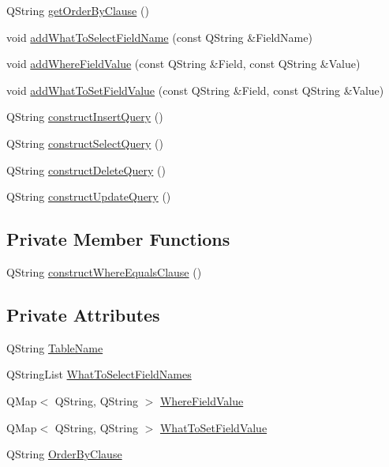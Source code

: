 \begin{DoxyCompactItemize}
\item 
Q\+String \hyperlink{class_query_constructor_a1041679e9ba316cd61ddca2d0d73360d}{get\+Order\+By\+Clause} ()
\item 
void \hyperlink{class_query_constructor_ab184e96ccdb30c0d6bedd904b6614e12}{add\+What\+To\+Select\+Field\+Name} (const Q\+String \&Field\+Name)
\item 
void \hyperlink{class_query_constructor_ad72f9e11656f92958cd6751eaaa70e0e}{add\+Where\+Field\+Value} (const Q\+String \&Field, const Q\+String \&Value)
\item 
void \hyperlink{class_query_constructor_a651b75170a7a1c7ddeae3758889133b0}{add\+What\+To\+Set\+Field\+Value} (const Q\+String \&Field, const Q\+String \&Value)
\item 
Q\+String \hyperlink{class_query_constructor_a707ac10b6fd4dfa235e2310b0259ea8e}{construct\+Insert\+Query} ()
\item 
Q\+String \hyperlink{class_query_constructor_ae832ca3bc59df18cb8ef08fc1d9fd75f}{construct\+Select\+Query} ()
\item 
Q\+String \hyperlink{class_query_constructor_a1585447293c477d7c5bebf4049cbbc07}{construct\+Delete\+Query} ()
\item 
Q\+String \hyperlink{class_query_constructor_ab17ea91cdd25440b863775526018da22}{construct\+Update\+Query} ()
\end{DoxyCompactItemize}
\subsection*{Private Member Functions}
\begin{DoxyCompactItemize}
\item 
Q\+String \hyperlink{class_query_constructor_a7c864e227c2e76cc40a887314d43a0fe}{construct\+Where\+Equals\+Clause} ()
\end{DoxyCompactItemize}
\subsection*{Private Attributes}
\begin{DoxyCompactItemize}
\item 
Q\+String \hyperlink{class_query_constructor_a228bdb4e6c32a592d96fe0a2562d7220}{Table\+Name}
\item 
Q\+String\+List \hyperlink{class_query_constructor_a70251e50580cef59cbbee0c4626cf32f}{What\+To\+Select\+Field\+Names}
\item 
Q\+Map$<$ Q\+String, Q\+String $>$ \hyperlink{class_query_constructor_ad20cc356b8452f51ddb326e989b3db9d}{Where\+Field\+Value}
\item 
Q\+Map$<$ Q\+String, Q\+String $>$ \hyperlink{class_query_constructor_a13e503b74e3422d2b816e5e41e646f04}{What\+To\+Set\+Field\+Value}
\item 
Q\+String \hyperlink{class_query_constructor_ad17e64b29d7e1f8fb61756eff17dd099}{Order\+By\+Clause}
\end{DoxyCompactItemize}


